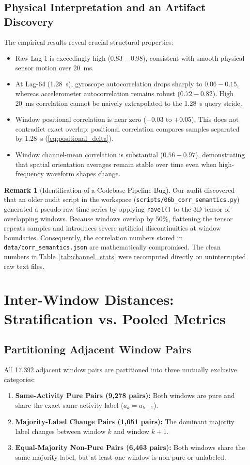\documentclass[11pt,a4paper]{article}
\newcommand{\code}[1]{{\small\ttfamily\nolinkurl{#1}}}
\theoremstyle{definition}
\newtheorem{remark}[proposition]{Remark}
\begin{document}
\subsection{Physical Interpretation and an Artifact Discovery}
The empirical results reveal crucial structural properties:
\begin{itemize}
\item Raw Lag-1 is exceedingly high ($0.83 - 0.98$), consistent with smooth physical sensor motion over 20~ms.
\item At Lag-64 (1.28~s), gyroscope autocorrelation drops sharply to $0.06 - 0.15$, whereas accelerometer autocorrelation remains robust ($0.72 - 0.82$). High 20~ms correlation cannot be naively extrapolated to the 1.28~s query stride.
\item Window positional correlation is near zero ($-0.03$ to $+0.05$). This does not contradict exact overlap: positional correlation compares samples separated by 1.28~s (\eqref{eq:positional_delta}).
\item Window channel-mean correlation is substantial ($0.56 - 0.97$), demonstrating that spatial orientation averages remain stable over time even when high-frequency waveform shapes change.
\end{itemize}

\begin{remark}[Identification of a Codebase Pipeline Bug]
Our audit discovered that an older audit script in the workspace (\code{scripts/06b_corr_semantics.py}) generated a pseudo-raw time series by applying \code{ravel()} to the 3D tensor of overlapping windows. Because windows overlap by 50\%, flattening the tensor repeats samples and introduces severe artificial discontinuities at window boundaries. Consequently, the correlation numbers stored in \code{data/corr_semantics.json} are mathematically compromised. The clean numbers in Table~\ref{tab:channel_stats} were recomputed directly on uninterrupted raw text files.
\end{remark}

\section{Inter-Window Distances: Stratification vs. Pooled Metrics}

\subsection{Partitioning Adjacent Window Pairs}
All 17,392 adjacent window pairs are partitioned into three mutually exclusive categories:
\begin{enumerate}
\item \textbf{Same-Activity Pure Pairs (9,278 pairs):} Both windows are pure and share the exact same activity label ($a_k = a_{k+1}$).
\item \textbf{Majority-Label Change Pairs (1,651 pairs):} The dominant majority label changes between window $k$ and window $k+1$.
\item \textbf{Equal-Majority Non-Pure Pairs (6,463 pairs):} Both windows share the same majority label, but at least one window is non-pure or unlabeled.
\end{enumerate}
\end{document}
